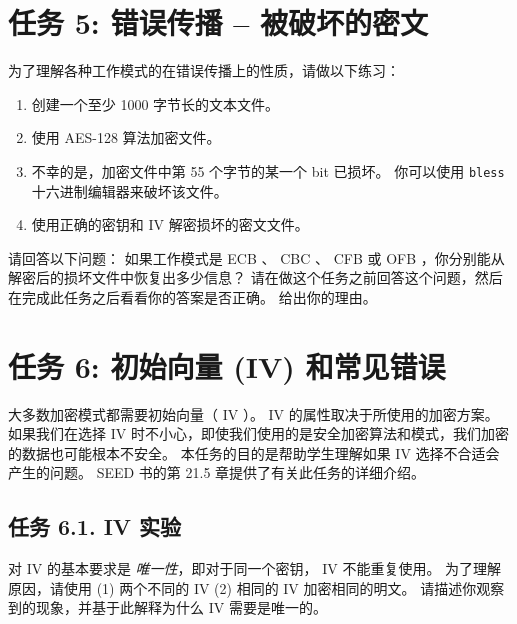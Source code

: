 \section{任务 5: 错误传播 -- 被破坏的密文}

为了理解各种工作模式的在错误传播上的性质，请做以下练习：

\begin{enumerate}
\item 创建一个至少 1000 字节长的文本文件。
\item 使用 AES-128 算法加密文件。
\item 不幸的是，加密文件中第 55 个字节的某一个 bit 已损坏。
      你可以使用 \texttt{bless} 十六进制编辑器来破坏该文件。
\item 使用正确的密钥和 IV 解密损坏的密文文件。
\end{enumerate}

请回答以下问题：
如果工作模式是 ECB 、 CBC 、 CFB 或 OFB ，你分别能从解密后的损坏文件中恢复出多少信息？
请在做这个任务之前回答这个问题，然后在完成此任务之后看看你的答案是否正确。
给出你的理由。





\section{任务 6: 初始向量 (IV) 和常见错误}

大多数加密模式都需要初始向量（ IV ）。
IV 的属性取决于所使用的加密方案。
如果我们在选择 IV 时不小心，即使我们使用的是安全加密算法和模式，我们加密的数据也可能根本不安全。
本任务的目的是帮助学生理解如果 IV 选择不合适会产生的问题。
SEED 书的第 21.5 章提供了有关此任务的详细介绍。


\subsection{任务 6.1. IV 实验}

对 IV 的基本要求是 \textit{唯一性}，即对于同一个密钥， IV 不能重复使用。
为了理解原因，请使用 (1) 两个不同的 IV (2) 相同的 IV 加密相同的明文。
请描述你观察到的现象，并基于此解释为什么 IV 需要是唯一的。



